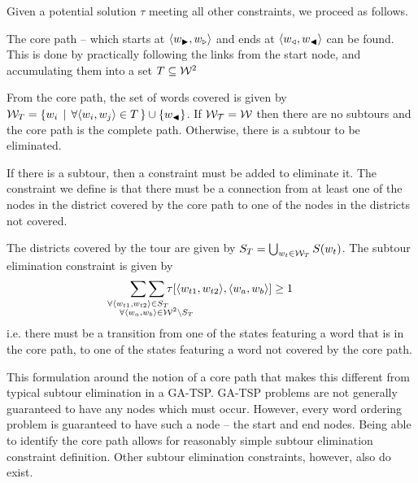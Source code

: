 \documentclass[twocolumn]{article}
\begin{document}
Given a potential solution $\tau$ meeting all other constraints, we proceed as follows.

The core path -- which starts at $\langle w_{\blacktriangleright},w_{\triangleright}\rangle$
and ends at $\langle w_{\triangleleft},w_{\blacktriangleleft}\rangle$ can be found. This is done
by practically following the links from the start node, and accumulating
them into a set $T\subseteq\mathcal{W}^{2}$

From the core path, the set of words covered is given by $\mathcal{W}_{T}=\{w_{i}\,\mid\,\forall\langle w_{i},w_{j}\rangle\in T\,\}\cup\{w_{\blacktriangleleft}\}$.
If $\mathcal{W_{T}}=\mathcal{W}$ then there are no subtours and the core path
is the complete path. Otherwise, there is a subtour to be eliminated.

If there is a subtour, then a constraint must be
added to eliminate it. The constraint we define is that there must be a connection from at least one of the nodes in the district covered by the core path to
one of the nodes in the districts not covered.

The districts covered by the tour are given by $S_{T}=\bigcup_{w_{t}\in \mathcal{W}_{T}}S(w_{t})$. The subtour elimination constraint is given by 
\displayunskip
\begin{equation*}
  \sum_{\mathclap{\forall\langle w_{t1},w_{t2}\rangle\in S_{T}}}
  \sum_{\mathclap{\substack{\; \\ \;\\ \forall\langle w_{a},w_{b}\rangle\in\W^{2}\backslash S_{T}}}}
  \tau[\langle w_{t1},w_{t2}\rangle,\langle w_{a},w_{b}\rangle]\ge1
\end{equation*}
i.e. there must be a transition from one of the states featuring a
word that is in the core path, to one of the states featuring a word
not covered by the core path.


This formulation around the notion of a core path that makes this different from typical subtour elimination in a GA-TSP. GA-TSP problems are not generally guaranteed to have any nodes which must occur. However, every word ordering problem is guaranteed to have such a node -- the start and end nodes. Being able to identify the core path allows for reasonably simple subtour elimination constraint definition. Other subtour elimination constraints, however, also do exist.
\end{document}
